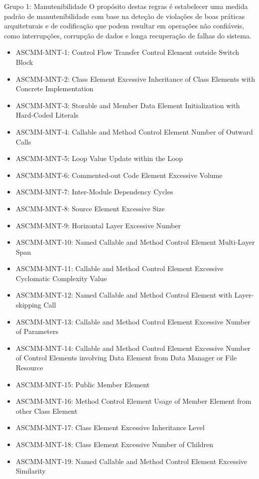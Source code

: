\documentclass[openany,10pt,a4paper]{article}
\begin{document}
\begin{appendix}
Grupo 1: Manutenibilidade
O propósito destas regras é estabelecer uma medida padrão de manutenibilidade com base na deteção de violações de boas práticas arquiteturais e de codificação que podem resultar em operações não confiáveis, como interrupções, corrupção de dados e longa recuperação de falhas do sistema.
\begin{samepage}
\begin{itemize}
	\setlength\itemsep{0em}
	\item ASCMM-MNT-1: Control Flow Transfer Control Element outside Switch Block
	\item ASCMM-MNT-2: Class Element Excessive Inheritance of Class Elements with Concrete Implementation
	\item ASCMM-MNT-3: Storable and Member Data Element Initialization with Hard-Coded Literals
	\item ASCMM-MNT-4: Callable and Method Control Element Number of Outward Calls
	\item ASCMM-MNT-5: Loop Value Update within the Loop
	\item ASCMM-MNT-6: Commented-out Code Element Excessive Volume
	\item ASCMM-MNT-7: Inter-Module Dependency Cycles
	\item ASCMM-MNT-8: Source Element Excessive Size
	\item ASCMM-MNT-9: Horizontal Layer Excessive Number
	\item ASCMM-MNT-10: Named Callable and Method Control Element Multi-Layer Span
	\item ASCMM-MNT-11: Callable and Method Control Element Excessive Cyclomatic Complexity Value
	\item ASCMM-MNT-12: Named Callable and Method Control Element with Layer-skipping Call
	\item ASCMM-MNT-13: Callable and Method Control Element Excessive Number of Parameters
	\item ASCMM-MNT-14: Callable and Method Control Element Excessive Number of Control Elements involving Data Element from Data Manager or File Resource
	\item ASCMM-MNT-15: Public Member Element	
	\item ASCMM-MNT-16: Method Control Element Usage of Member Element from other Class Element
	\item ASCMM-MNT-17: Class Element Excessive Inheritance Level
	\item ASCMM-MNT-18: Class Element Excessive Number of Children
	\item ASCMM-MNT-19: Named Callable and Method Control Element Excessive Similarity

\end{itemize}
\end{samepage}
\end{appendix}
\end{document}

